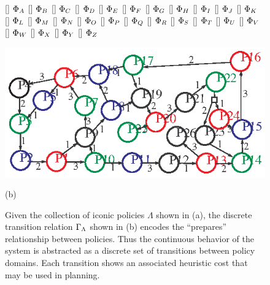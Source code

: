 \begin{figure}[bt]
\begin{minipage}{0.85\linewidth}
  \centering 
{}[]{\textcolor{red}{ $\Phi_A$}}
[]{\textcolor{blue}{ $\Phi_B$}}
[]{\textcolor{DarkGreen}{ $\Phi_C$}}
[]{\textcolor{black}{ $\Phi_D$}}
[]{\textcolor{blue}{ $\Phi_E$}}
[]{\textcolor{red}{ $\Phi_F$}}
[]{\textcolor{DarkGreen}{ $\Phi_G$}}
[]{\textcolor{blue}{ $\Phi_H$}}
[]{\textcolor{black}{ $\Phi_I$}}
[]{\textcolor{DarkGreen}{ $\Phi_J$}}
[]{\textcolor{blue}{ $\Phi_K$}}
[]{\textcolor{black}{ $\Phi_L$}}
[]{\textcolor{red}{ $\Phi_M$}}
[]{\textcolor{DarkGreen}{ $\Phi_N$}}
[]{\textcolor{blue}{ $\Phi_O$}}
[]{\textcolor{red}{ $\Phi_P$}}
[]{\textcolor{DarkGreen}{ $\Phi_Q$}}
[]{\textcolor{blue}{ $\Phi_R$}}
[]{\textcolor{black}{ $\Phi_S$}}
[]{\textcolor{red}{ $\Phi_T$}}
[]{\textcolor{black}{ $\Phi_U$}}
[]{\textcolor{DarkGreen}{ $\Phi_V$}}
[]{\textcolor{black}{ $\Phi_W$}}
[]{\textcolor{red}{ $\Phi_X$}}
[]{\textcolor{DarkGreen}{ $\Phi_Y$}}
[]{\textcolor{black}{ $\Phi_Z$}}

  \includegraphics[width=\linewidth]{graphics/collectionGraph.eps} 

{\footnotesize (b)}
\end{minipage}

\caption[Example collection of policies and prepares graph]{Given the
  collection of iconic policies $\Lambda$ shown in (a), the discrete
  transition relation $\Gamma_{\Lambda}$ shown in (b) encodes the ``prepares''
  relationship between policies.  Thus the continuous behavior of the
  system is abstracted as a discrete set of transitions between policy
  domains.  Each transition shows an associated heuristic cost that
  may be used in planning.}

  \label{fig:approach_prepares} 

\end{figure}

